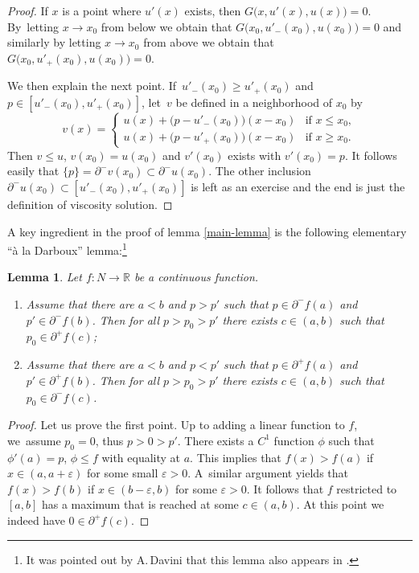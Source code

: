 \documentclass[10pt]{amsart}
\newtheorem{lem}[thm]{Lemma}
\theoremstyle{definition}
\newcommand{\R}{\mathbb{R}}
\begin{document}
\begin{appendix}
\begin{proof}
If $x$ is a point where $u'(x)$ exists, then $G\bigl(x,u'(x),u(x)\bigr)=0$. By~letting $x\to x_0$ from below we obtain that $ G(x_0,u'_-(x_0),u(x_0)\bigr)=0$ and similarly by letting $x\to x_0$ from above we obtain that $ G(x_0,u'_+(x_0),u(x_0)\bigr)=0$.

We then explain the next point. If~$ u'_-(x_0)\geqslant u'_+(x_0)$ and $p\in [ u'_-(x_0) , u'_+(x_0)]$, let~$v$ be defined in a neighborhood of $x_0$ by
\[
v(x) =
\begin{cases}
u(x) + \bigl(p- u'_-(x_0)\bigr)(x-x_0) &\text{if } x\leqslant x_0,\\
u(x) + \bigl(p- u'_+(x_0)\bigr)(x-x_0) &\text{if } x\geqslant x_0.
\end{cases}
\]
Then $v\leqslant u$, $v(x_0) = u(x_0)$ and $v'(x_0)$ exists with $v'(x_0) =p$. It follows easily that $\{p\} = \partial^- v(x_0) \subset \partial^- u(x_0)$. The other inclusion $\partial^-u(x_0) \subset [ u'_-(x_0) , u'_+(x_0)]$ is left as an exercise and the end is just the definition of viscosity solution.
\end{proof}

A key ingredient in the proof of lemma \ref{main-lemma} is the following elementary ``à la Darboux'' lemma:\footnote{It was pointed out by A.\,Davini that this lemma also appears in \cite{Tran}.}

\begin{lem}\label{dif}
Let $f : N \to \R$ be a continuous function.
\begin{enumerate}
\item Assume that there are $a<b$ and $p>p'$ such that $p\in \partial^- f(a)$ and $p'\in \partial^- f(b)$. Then for all $p>p_0>p'$ there exists $c\in (a,b)$ such that $p_0\in \partial^+ f(c)$;
\item Assume that there are $a<b$ and $p<p'$ such that $p\in \partial^+ f(a)$ and $p'\in \partial^+ f(b)$. Then for all $p>p_0>p'$ there exists $c\in (a,b)$ such that $p_0\in \partial^- f(c)$.
\end{enumerate}

\end{lem}
\begin{proof}
Let us prove the first point. Up to adding a linear function to $f$, we~assume $p_0=0$, thus $p>0>p'$. There exists a $C^1$ function $\phi$ such that $\phi'(a) = p$, $\phi\leqslant f$ with equality at $a$. This implies that $f(x)> f(a)$ if $x\in (a,a+\varepsilon)$ for some small $\varepsilon>0$. A~similar argument yields that $f(x)> f(b)$ if $x\in (b-\varepsilon,b)$ for some $\varepsilon>0$. It follows that $f$ restricted to $[a,b]$ has a maximum that is reached at some $c\in(a,b)$. At this point we indeed have $0\in \partial^+ f(c)$.
\end{proof}


\end{appendix}
\end{document}
